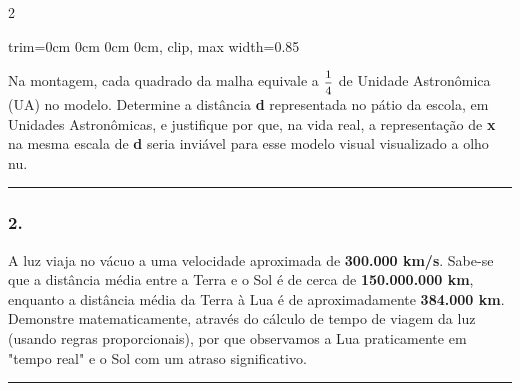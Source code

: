 \documentclass[twoside, 10pt, a4paper]{article}
\newlength{\espacoPreQuestao}
\newlength{\espacoQuestao}
\newcommand{\larguraTikz}{0.85\linewidth} %
\begin{document}
\begin{multicols*}{2}
\begin{center}
\begin{adjustbox}{trim=0cm 0cm 0cm 0cm, clip, max width=\larguraTikz}
\end{adjustbox}
\end{center}

Na montagem, cada quadrado da malha equivale a $ \mfrac{1}{4} $ de Unidade Astronômica (UA) no modelo. Determine a distância \textbf{d} representada no pátio da escola, em Unidades Astronômicas, e justifique por que, na vida real, a representação de \textbf{x} na mesma escala de \textbf{d} seria inviável para esse modelo visual visualizado a olho nu.
\par\vspace{\espacoQuestao}

\noindent\textcolor{CorLinha}{\rule{\linewidth}{0.5pt}} 
\par\vspace{\espacoPreQuestao}
\subsubsection*{2.} A luz viaja no vácuo a uma velocidade aproximada de \textbf{300.000 km/s}. Sabe-se que a distância média entre a Terra e o Sol é de cerca de \textbf{150.000.000 km}, enquanto a distância média da Terra à Lua é de aproximadamente \textbf{384.000 km}. Demonstre matematicamente, através do cálculo de tempo de viagem da luz (usando regras proporcionais), por que observamos a Lua praticamente em "tempo real" e o Sol com um atraso significativo.
\par\vspace{\espacoQuestao}

\noindent\textcolor{CorLinha}{\rule{\linewidth}{0.5pt}} 
\par\vspace{\espacoPreQuestao}

\end{multicols*}
\end{document}
